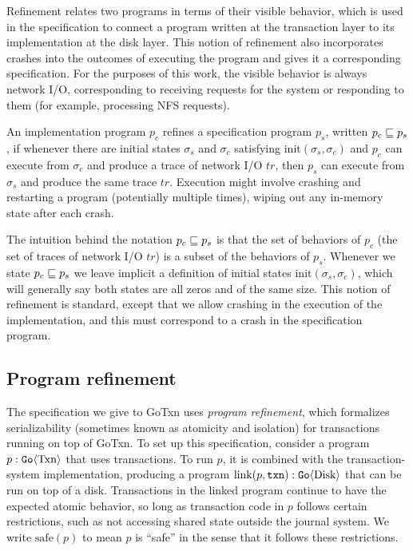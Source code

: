 Refinement relates two programs in terms of their visible behavior, which is
used in the specification
to connect a program written at the transaction layer to its
implementation at the disk layer. This notion of refinement also incorporates
crashes into the outcomes of executing the program and gives it a corresponding specification.
For the purposes of this work, the visible
behavior is always network I/O, corresponding to receiving requests for the
system or responding to them (for example, processing NFS requests).

\begin{definition}[Refinement]
  An implementation program $p_{c}$ refines a specification program $p_{s}$,
written $p_{c} \sqsubseteq p_{s}$, if whenever there are initial states
$\sigma_{s}$ and $\sigma_{c}$ satisfying $\mathrm{init}(\sigma_{s}, \sigma_{c})$
and $p_{c}$ can execute from $\sigma_{c}$ and produce a trace of network I/O
$\textit{tr}$, then $p_{s}$ can execute from $\sigma_{s}$ and produce the same trace
$\textit{tr}$.  Execution might involve crashing and restarting a program (potentially
multiple times), wiping out any in-memory state after each crash.
  \label{def:refinement}
\end{definition}

The intuition behind the notation $p_{c} \sqsubseteq p_{s}$ is that the set of
behaviors of $p_{c}$ (the set of traces of network I/O $\textit{tr}$) is a subset of the
behaviors of $p_{s}$. Whenever we state $p_{c} \sqsubseteq p_{s}$ we leave implicit
a definition of initial states $\mathrm{init}(\sigma_{s}, \sigma_{c})$, which
will generally say both states are all zeros and of the same size. This notion
of refinement is standard, except that we allow crashing in the execution of the
implementation, and this must correspond to a crash in the specification
program.

\subsection{Program refinement}
\label{sec:gotxn:program-refinement}

The specification we give to GoTxn uses \emph{program refinement},
which formalizes serializability (sometimes known as atomicity and isolation)
for transactions running on top of GoTxn.
To set up this specification, consider a program $p : \mathtt{Go}\langle \mathrm{Txn} \rangle$ that
uses transactions.
To run $p$, it is combined with the transaction-system implementation, producing
a program $\mathrm{link}(p, \texttt{txn}) : \mathtt{Go}\langle \mathrm{Disk} \rangle$ that can be run on
top of a disk.
Transactions in the linked program continue to have the expected atomic
behavior, so long as transaction code in $p$ follows certain restrictions, such
as not accessing shared state outside the journal system.  We write
$\mathrm{safe}(p)$ to mean $p$ is ``safe'' in the sense that it follows these restrictions.

